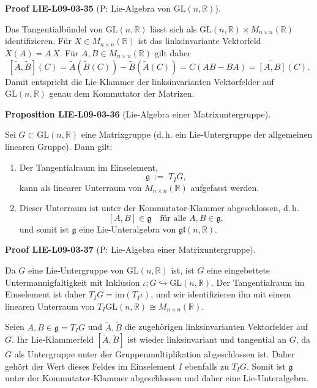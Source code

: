 \documentclass[10pt, letterpaper]{article}
\newcommand{\CustomHeading}[3]{%
  \par\medskip\noindent%
  \textbf{#1 #2} \textnormal{(#3)}.\enskip%
}
\newenvironment{PROP}[2]{\CustomHeading{Proposition}{#1}{#2}}{}
\newenvironment{PROOF}[2]{\CustomHeading{Proof}{#1}{#2}}{}
\begin{document}
\begin{PROOF}{LIE-L09-03-35}{P: Lie-Algebra von $\mathrm{GL}(n,\mathbb{R})$}
Das Tangentialbündel von $\mathrm{GL}(n,\mathbb{R})$ lässt sich als
$\mathrm{GL}(n,\mathbb{R})\times M_{n\times n}(\mathbb{R})$ identifizieren.
Für $X\in M_{n\times n}(\mathbb{R})$ ist das linksinvariante Vektorfeld
$\widetilde X(A)=A\,X$. Für $A,B\in M_{n\times n}(\mathbb{R})$ gilt daher
\[
[\widetilde A,\widetilde B](C)
=\widetilde A(\widetilde B(C))-\widetilde B(\widetilde A(C))
=C(AB-BA)
=\widetilde{[A,B]}(C).
\]
Damit entspricht die Lie-Klammer der linksinvarianten Vektorfelder auf
$\mathrm{GL}(n,\mathbb{R})$ genau dem Kommutator der Matrizen.
\end{PROOF}

\begin{PROP}{LIE-L09-03-36}{Lie-Algebra einer Matrixuntergruppe}
Sei $G\subset \mathrm{GL}(n,\mathbb{R})$ eine Matrixgruppe (d.\,h. ein Lie‐Untergruppe der allgemeinen linearen Gruppe).
Dann gilt:
\begin{enumerate}
\item Der Tangentialraum im Einselement,
\[
\mathfrak g\;:=\;T_I G,
\]
kann als linearer Unterraum von $M_{n\times n}(\mathbb{R})$ aufgefasst werden.
\item Dieser Unterraum ist unter der Kommutator‐Klammer abgeschlossen, d.\,h.
\[
[A,B]\in \mathfrak g \quad \text{für alle }A,B\in \mathfrak g,
\]
und somit ist $\mathfrak g$ eine Lie‐Unteralgebra von $\mathfrak{gl}(n,\mathbb{R})$.
\end{enumerate}
\end{PROP}

\begin{PROOF}{LIE-L09-03-37}{P: Lie-Algebra einer Matrixuntergruppe}
Da $G$ eine Lie‐Untergruppe von $\mathrm{GL}(n,\mathbb{R})$ ist, ist $G$ eine eingebettete Untermannigfaltigkeit
mit Inklusion $\iota:G\hookrightarrow \mathrm{GL}(n,\mathbb{R})$.
Der Tangentialraum im Einselement ist daher $T_I G=\mathrm{im}(T_I\iota)$, und wir identifizieren ihn
mit einem linearen Unterraum von $T_I\mathrm{GL}(n,\mathbb{R})\cong M_{n\times n}(\mathbb{R})$.

Seien $A,B\in \mathfrak g=T_I G$ und $\widetilde A,\widetilde B$ die zugehörigen linksinvarianten
Vektorfelder auf $G$. Ihr Lie‐Klammerfeld $[\widetilde A,\widetilde B]$ ist wieder linksinvariant und tangential an $G$,
da $G$ als Untergruppe unter der Gruppenmultiplikation abgeschlossen ist.
Daher gehört der Wert dieses Feldes im Einselement $I$ ebenfalls zu $T_I G$.
Somit ist $\mathfrak g$ unter der Kommutator‐Klammer abgeschlossen und daher eine Lie‐Unteralgebra.
\end{PROOF}
\end{document}
